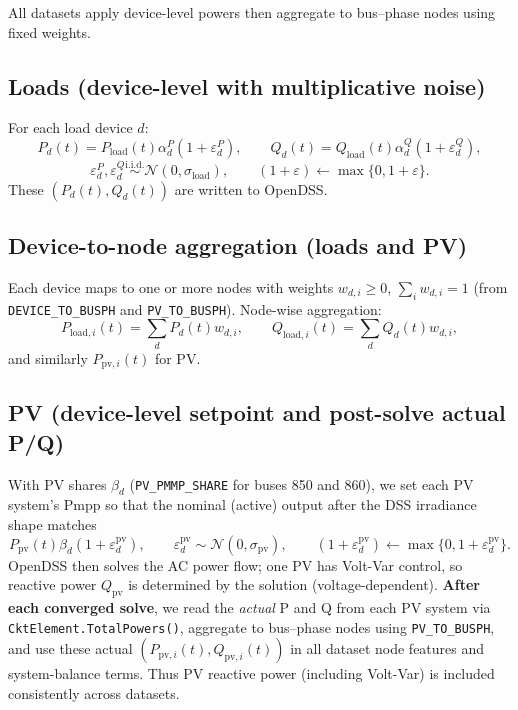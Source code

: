 \documentclass[11pt]{article}
\begin{document}
All datasets apply device-level powers then aggregate to bus--phase nodes using fixed
weights.

\subsection*{Loads (device-level with multiplicative noise)}

For each load device $d$:
\[
P_d(t)=P_{\mathrm{load}}(t)\alpha_d^P(1+\varepsilon_d^P),\qquad
Q_d(t)=Q_{\mathrm{load}}(t)\alpha_d^Q(1+\varepsilon_d^Q),
\]
\[
\varepsilon_d^P,\varepsilon_d^Q\stackrel{\mathrm{i.i.d.}}{\sim}\mathcal{N}(0,\sigma_{\mathrm{load}}),\qquad
(1+\varepsilon)\leftarrow\max\{0,1+\varepsilon\}.
\]
These $(P_d(t),Q_d(t))$ are written to OpenDSS.

\subsection*{Device-to-node aggregation (loads and PV)}

Each device maps to one or more nodes with weights $w_{d,i}\ge 0$, $\sum_i w_{d,i}=1$
(from \texttt{DEVICE\_TO\_BUSPH} and \texttt{PV\_TO\_BUSPH}). Node-wise aggregation:
\[
P_{\mathrm{load},i}(t)=\sum_d P_d(t)w_{d,i},\qquad
Q_{\mathrm{load},i}(t)=\sum_d Q_d(t)w_{d,i},
\]
and similarly $P_{\mathrm{pv},i}(t)$ for PV.

\subsection*{PV (device-level setpoint and post-solve actual P/Q)}

With PV shares $\beta_d$ (\texttt{PV\_PMMP\_SHARE} for buses 850 and 860), we set each PV system's Pmpp so that the nominal (active) output after the DSS irradiance shape matches
\[
P_{\mathrm{pv}}(t)\beta_d(1+\varepsilon_d^{\mathrm{pv}}),\qquad
\varepsilon_d^{\mathrm{pv}}\sim\mathcal{N}(0,\sigma_{\mathrm{pv}}),\qquad
(1+\varepsilon_d^{\mathrm{pv}})\leftarrow\max\{0,1+\varepsilon_d^{\mathrm{pv}}\}.
\]
OpenDSS then solves the AC power flow; one PV has Volt-Var control, so reactive power $Q_{\mathrm{pv}}$ is determined by the solution (voltage-dependent). \textbf{After each converged solve}, we read the \emph{actual} P and Q from each PV system via \texttt{CktElement.TotalPowers()}, aggregate to bus--phase nodes using \texttt{PV\_TO\_BUSPH}, and use these actual $(P_{\mathrm{pv},i}(t),Q_{\mathrm{pv},i}(t))$ in all dataset node features and system-balance terms. Thus PV reactive power (including Volt-Var) is included consistently across datasets.
\end{document}
